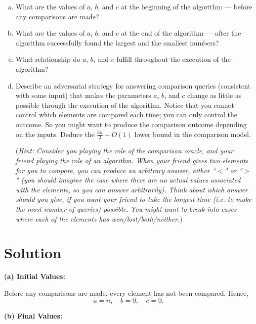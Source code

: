 \documentclass[11pt]{article}
\begin{document}
\begin{tcolorbox}[title={Problem 3 (Minimum and Maximum — Lower Bound, 35 pts)}]
    \begin{enumerate}[(a)]
        \item What are the values of $a$, $b$, and $c$ at the beginning of the algorithm — before any comparisons are made?
        \item What are the values of $a$, $b$, and $c$ at the end of the algorithm — after the algorithm successfully found the largest and the smallest numbers?
        \item What relationship do $a$, $b$, and $c$ fulfill throughout the execution of the algorithm?
        \item Describe an adversarial strategy for answering comparison queries (consistent with some input) that makes the parameters $a$, $b$, and $c$ change as little as possible through the execution of the algorithm. Notice that you cannot control which elements are compared each time; you can only control the outcome. So you might want to produce the comparison outcome depending on the inputs. Deduce the $\frac{3n}{2} - O(1)$ lower bound in the comparison model. 
        
        (\textit{Hint: Consider you playing the role of the comparison oracle, and your friend playing the role of an algorithm. When your friend gives two elements for you to compare, you can produce an arbitrary answer, either ``$<$" or ``$>$" (you should imagine the case where there are no actual values associated with the elements, so you can answer arbitrarily). Think about which answer should you give, if you want your friend to take the longest time (i.e. to make the most number of queries) possible. You might want to break into cases where each of the elements has won/lost/both/neither.})
    \end{enumerate}
    \end{tcolorbox}
    \section*{Solution}
    \textbf{(a) Initial Values:} 
    
    Before any comparisons are made, every element has not been compared. Hence,
    \[
    a = n,\quad b = 0,\quad c = 0.
    \]
    
    \bigskip
    
    \textbf{(b) Final Values:}
    
\end{document}
